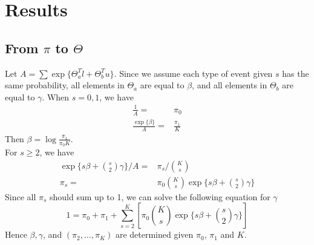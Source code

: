 \documentclass[11 pt, a4paper]{article}  %
\begin{document}
\newpage
\section{Results}
\subsection{From $\pi$ to $\Theta$}
Let $A =\sum\exp\{\Theta_a^T l + \Theta_b^{T} u\}$. Since we assume each type of event given $s$ has the same probability, all elements in $\Theta_a$ are equal to $\beta$, and all elements in $\Theta_b$ are equal to $\gamma$. When $s = 0, 1$, we have 
\begin{align*}
\frac{1}{A} = & \pi_0\\
\frac{\exp\{\beta\}}{A} = & \frac{\pi_1}{K}
\end{align*}
Then $\beta = \log \frac{\pi_1}{\pi_0 K}$.\\

For $s\geq 2$, we have
\begin{align*}
\exp\{s\beta + {s \choose 2}\gamma\}/A = & \pi_s/{K \choose s}\\
\pi_s = & \pi_0 {K \choose s} \exp\{s\beta + {s \choose 2}\gamma\}
\end{align*}
Since all $\pi_s$ should sum up to 1, we can solve the following equation for $\gamma$
\[1 = \pi_0 +\pi_1 + \sum_{s=2}^K \left[ \pi_0 {K \choose s} \exp\{s\beta + {s \choose 2}\gamma\}\right]\]
Hence $\beta,\gamma$, and $(\pi_2,\ldots,\pi_K)$ are determined given $\pi_0$, $\pi_1$ and $K$. 

%
\end{document}
